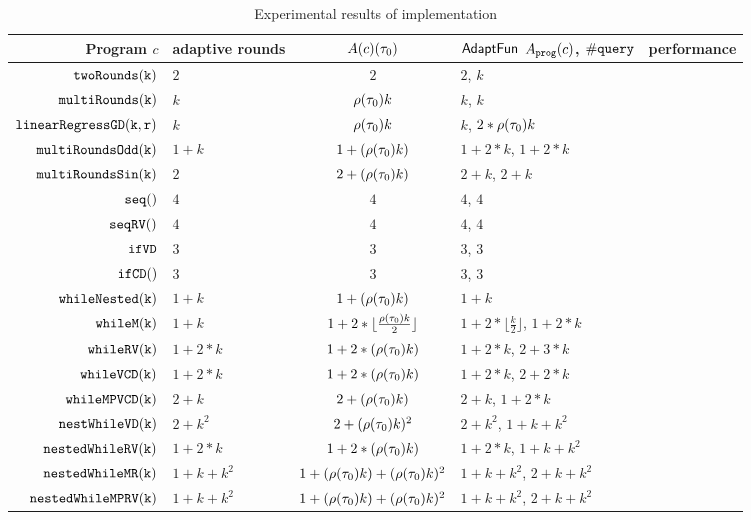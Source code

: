 \begin {table}[H]
    \caption{Experimental results of {\THESYSTEM} implementation}
        \label{tb:adapt-imp}
        \begin{center}
        \centering
{\footnotesize
        \begin{tabular}{ r | p{12mm} | c | p{25mm} | l}
         Program $c$ & adaptive \newline rounds 
         & $A(c) (\mathtt{\tau}_0)$ 
         & $\textsf{AdaptFun}$ \newline $A_{\mathtt{prog}}(c)$, $\# {\tt query}$ 
         & performance \\ 
         \hline
         \hline
         $  \mathtt{twoRounds(k)}$ & $2$ & $2$ & $2$, $k$ &  \\
         $  \mathtt{multiRounds(k)}$ & $k$ & $ \rho(\mathtt{\tau}_0) k $ & $k$, $k$  &    \\
         $  \mathtt{linearRegressGD(k, r)}$ & $k$ & $\rho(\mathtt{\tau}_0) k$ & $k$, $2 * \rho(\mathtt{\tau}_0) k$  &    \\
         $  \mathtt{multiRoundsOdd(k)}$ & $1 + k$ & $1 + (\rho(\mathtt{\tau}_0) k) $  & $1 +2 * k$, $1 + 2*k$  &    \\
         $  \mathtt{multiRoundsSin(k)}$    & $2$ & $2 + (\rho(\mathtt{\tau}_0) k) $ & $2 + k$, $2 + k$  &    \\
         $\mathtt{seq()}$ & $4$ & $4$ & $4$, $4$  \\ 
         $\mathtt{seqRV()}$ & $4$ & $4$ & $4$, $4$ \\  
         $ \mathtt{ifVD}$ & $3$ & $3$ & $3$, $3$ \\
         $\mathtt{ifCD()}$ & $3$ & $3$ & $3$, $3$  &    \\
         $ \mathtt{whileNested(k)}$ & $1+k$ & $1+ (\rho(\mathtt{\tau}_0) k)$ & $1+k$  &    \\
         $ \mathtt{whileM(k)}$ & $1 + k$ & $1 +2 * \lfloor \frac{\rho(\mathtt{\tau}_0) k}{2} \rfloor$ & $1 +2 * \lfloor \frac{k}{2} \rfloor$, $1 + 2 * k$  &    \\
         $ \mathtt{whileRV(k)}$ & $1 + 2*k$ & $1 + 2*(\rho(\mathtt{\tau}_0) k)$ & $1 + 2*k$, $2 + 3 * k$  &    \\
         $ \mathtt{whileVCD(k)}$ & $1 + 2*k$ & $1 + 2*(\rho(\mathtt{\tau}_0) k)$ & $1 + 2 * k$, $2 + 2 * k$  &    \\
         $ \mathtt{whileMPVCD(k)}$ & $2 + k$ & $2 + (\rho(\mathtt{\tau}_0) k)$  & $2 + k$, $1 + 2 * k$   &    \\
         $ \mathtt{nestWhileVD(k)}$ & $2 + k^2$ & $2 + (\rho(\mathtt{\tau}_0) k)^2$  & $2 + k^2$, $1 + k + k^2$   &    \\
         $ \mathtt{nestedWhileRV(k)}$ & $1 + 2*k$ & $1 + 2*(\rho(\mathtt{\tau}_0) k)$ & $1 + 2*k$,  $1 + k + k^2$   &    \\
         $ \mathtt{nestedWhileMR(k)}$ & $1 + k + k^2$ & $1 + (\rho(\mathtt{\tau}_0) k) + (\rho(\mathtt{\tau}_0) k)^2$  & $1 + k + k^2$,  $2 + k + k^2$  &    \\
         $ \mathtt{nestedWhileMPRV(k)}$ & $1 + k + k^2$ & $1 + (\rho(\mathtt{\tau}_0) k) + (\rho(\mathtt{\tau}_0) k)^2$  & $1 + k + k^2$,  $2 + k + k^2$  &    \\
        \end{tabular}
}        
\end{center}
\end{table}
